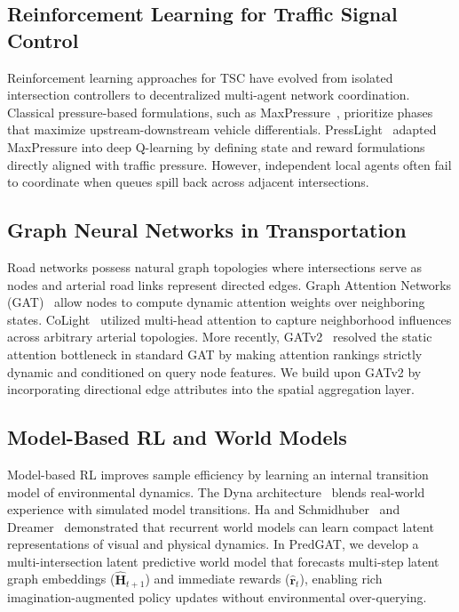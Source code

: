 \documentclass[11pt,a4paper,twocolumn]{article}
\begin{document}
\subsection{Reinforcement Learning for Traffic Signal Control}
Reinforcement learning approaches for TSC have evolved from isolated intersection controllers to decentralized multi-agent network coordination. Classical pressure-based formulations, such as MaxPressure~\cite{varaiya2013max}, prioritize phases that maximize upstream-downstream vehicle differentials. PressLight~\cite{wei2019presslight} adapted MaxPressure into deep Q-learning by defining state and reward formulations directly aligned with traffic pressure. However, independent local agents often fail to coordinate when queues spill back across adjacent intersections.

\subsection{Graph Neural Networks in Transportation}
Road networks possess natural graph topologies where intersections serve as nodes and arterial road links represent directed edges. Graph Attention Networks (GAT)~\cite{velickovic2018graph} allow nodes to compute dynamic attention weights over neighboring states. CoLight~\cite{wei2019colight} utilized multi-head attention to capture neighborhood influences across arbitrary arterial topologies. More recently, GATv2~\cite{brody2022gatv2} resolved the static attention bottleneck in standard GAT by making attention rankings strictly dynamic and conditioned on query node features. We build upon GATv2 by incorporating directional edge attributes into the spatial aggregation layer.

\subsection{Model-Based RL and World Models}
Model-based RL improves sample efficiency by learning an internal transition model of environmental dynamics. The Dyna architecture~\cite{sutton1991dyna} blends real-world experience with simulated model transitions. Ha and Schmidhuber~\cite{ha2018worldmodels} and Dreamer~\cite{hafner2023mastering} demonstrated that recurrent world models can learn compact latent representations of visual and physical dynamics. In PredGAT, we develop a multi-intersection latent predictive world model that forecasts multi-step latent graph embeddings ($\widehat{\mathbf{H}}_{t+1}$) and immediate rewards ($\widehat{\mathbf{r}}_t$), enabling rich imagination-augmented policy updates without environmental over-querying.
\end{document}

